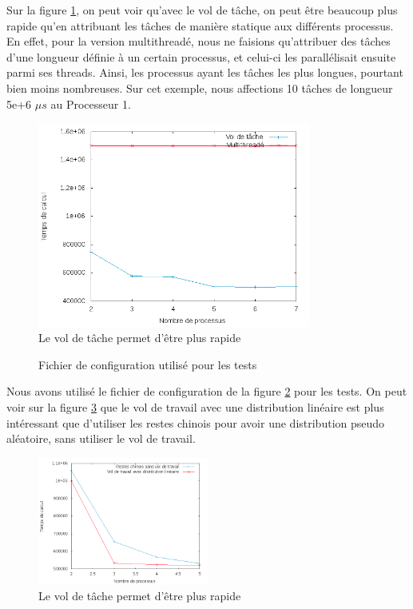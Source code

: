 Sur la figure \ref{fig:sp}, on peut voir qu'avec le vol de tâche, on peut être beaucoup plus rapide qu'en attribuant les tâches de manière statique aux différents processus. En effet, pour la version multithreadé, nous ne faisions qu'attribuer des tâches d'une longueur définie à un certain processus, et celui-ci les parallélisait ensuite parmi ses threads. Ainsi, les processus ayant les tâches les plus longues, pourtant bien moins nombreuses. Sur cet exemple, nous affections 10 tâches de longueur 5e+6 $\mu s$ au Processeur 1.
\begin{figure}[H]
\centering
\includegraphics[width=0.8\textwidth]{stats.png}
\caption{Le vol de tâche permet d'être plus rapide}
\label{fig:sp}
\end{figure}

\begin{figure}[H]
\centering

\caption{Fichier de configuration utilisé pour les tests}
\label{fig:conf}
\end{figure}
Nous avons utilisé le fichier de configuration de la figure \ref{fig:conf} pour les tests.
On peut voir sur la figure \ref{comp_chinois_vol} que le vol de travail avec une distribution linéaire est plus intéressant que d'utiliser les restes chinois pour avoir une distribution pseudo aléatoire, sans utiliser le vol de travail.
\begin{figure}[H]
\centering
\includegraphics[width=0.5\textwidth]{comp_chinois_vol.png}
\caption{Le vol de tâche permet d'être plus rapide}
\label{comp_chinois_vol}
\end{figure}
